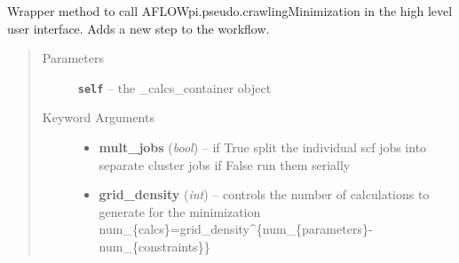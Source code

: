 \documentclass[letterpaper,10pt,english]{sphinxmanual}
\begin{document}
\begin{fulllineitems}

\begin{fulllineitems}
\label{prep:prep.calcs_container.change_input}
\end{fulllineitems}


\begin{fulllineitems}
\label{prep:prep.calcs_container.change_pseudos}
\end{fulllineitems}


\begin{fulllineitems}
\label{prep:prep.calcs_container.conventional_cell_input}
\end{fulllineitems}


\begin{fulllineitems}
\label{prep:prep.calcs_container.crawl_min}
Wrapper method to call AFLOWpi.pseudo.crawlingMinimization in the high level user interface.
Adds a new step to the workflow.
\begin{quote}\begin{description}
\item[{Parameters}] \leavevmode
\textbf{\texttt{self}} -- the \_calcs\_container object

\item[{Keyword Arguments}] \leavevmode\begin{itemize}
\item {} 
\textbf{mult\_jobs} (\emph{bool}) --
if True split the individual scf jobs into separate cluster jobs
if False run them serially

\item {} 
\textbf{grid\_density} (\emph{int}) --
controls the number of calculations to generate for the minimization
num\_\{calcs\}=grid\_density\textasciicircum{}\{num\_\{parameters\}-num\_\{constraints\}\}


\end{itemize}
\end{description}
\end{quote}
\end{fulllineitems}
\end{fulllineitems}
\end{document}
